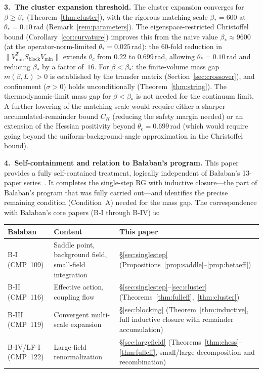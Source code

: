\documentclass[11pt]{article}
\theoremstyle{definition}
\begin{document}
\medskip\noindent\textbf{3.~The cluster expansion threshold.}
The cluster expansion converges for $\beta\ge\beta_*$
(Theorem~\ref{thm:cluster}), with the rigorous matching scale
$\beta_*=600$ at $\theta_*=0.10$\,rad
(Remark~\ref{rem:parameters}).  The eigenspace-restricted Christoffel
bound (Corollary~\ref{cor:curvature}) improves this from the naive
value $\beta_*\approx 9600$ (at the operator-norm-limited
$\theta_*=0.025$\,rad): the 60-fold reduction in
$\|V_{\min}^T S_{\mathrm{block}} V_{\min}\|$
extends $\theta_c$ from $0.22$ to $0.699$\,rad,
allowing $\theta_*=0.10$\,rad and reducing $\beta_*$ by a factor
of~$16$.  For
$\beta<\beta_*$: the finite-volume mass gap $m(\beta,L)>0$
is established by the transfer matrix (Section~\ref{sec:crossover}),
and confinement ($\sigma>0$) holds unconditionally
(Theorem~\ref{thm:string}).  The thermodynamic-limit mass gap for
$\beta<\beta_*$ is not needed for the continuum limit.
A further lowering of the matching scale would require either
a sharper accumulated-remainder bound $C_H$ (reducing the
safety margin needed) or an extension of the Hessian positivity
beyond $\theta_c=0.699$\,rad (which would require going
beyond the uniform-background-angle approximation in the
Christoffel bound).

\medskip\noindent\textbf{4.~Self-containment and relation to Ba\l aban's program.}
This paper provides a fully self-contained treatment, logically
independent of Ba\l aban's 13-paper series~\cite{BalabanI,BalabanII,BalabanIII,BalabanLF1,BalabanLF2}.
It completes the single-step RG with inductive closure---the part
of Balaban's program that was fully carried out---and identifies
the precise remaining condition (Condition~A) needed for the mass gap.
The correspondence with Ba\l aban's core papers (B-I through B-IV) is:

\begin{center}
\begin{tabular}{p{3cm}p{4cm}p{5cm}}
\toprule
\textbf{Balaban} & \textbf{Content} & \textbf{This paper}\\
\midrule
B-I (CMP~109) & Saddle point, background field, small-field integration &
\S\ref{sec:singlestep} (Propositions~\ref{prop:saddle}--\ref{prop:betaeff})\\
B-II (CMP~116) & Effective action, coupling flow &
\S\ref{sec:singlestep}--\ref{sec:cluster} (Theorems~\ref{thm:fulleff},~\ref{thm:cluster})\\
B-III (CMP~119) & Convergent multi-scale expansion &
\S\ref{sec:blocking} (Theorem~\ref{thm:inductive}, full inductive
closure with remainder accumulation)\\
B-IV/LF-I (CMP~122) & Large-field renormalization &
\S\ref{sec:largefield} (Theorems~\ref{thm:chess}--\ref{thm:fulleff},
small/large decomposition and recombination)\\
\bottomrule
\end{tabular}
\end{center}
\end{document}

